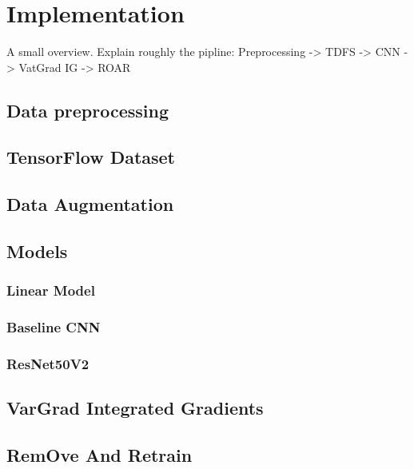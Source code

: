 \chapter{Implementation}
\label{ch:implementation}

A small overview. Explain roughly the pipline: Preprocessing -> TDFS -> CNN -> VatGrad IG -> ROAR

\section{Data preprocessing}
\label{sec:implementation:data_pp}


\section{TensorFlow Dataset}
\label{sec:implementation:tfds}

\section{Data Augmentation}
\label{sec:implementation:data_augmentation}

\section{Models}
\label{sec:implementation:models}

\subsection{Linear Model}
\label{sec:implementation:lm}

\subsection{Baseline CNN}
\label{sec:implementation:BL_CNN}

\subsection{ResNet50V2}
\label{sec:implementation:RN50V2}


\section{VarGrad Integrated Gradients}
\label{sec:implementation:VarGrad_IG}


\section{RemOve And Retrain}
\label{sec:implementation:ROAR}

